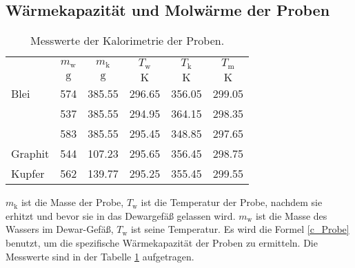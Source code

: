 \subsection{Wärmekapazität und Molwärme der Proben}
\begin{table}[htp]
	\centering
	\begin{tabular}{lccccc}
		\toprule
		& {$m_\text{w}$} & {$m_\text{k}$} & {$T_\text{w}$} & {$T_\text{k}$} & {$T_\text{m}$}\\
		&{$\si{\gram}$}& {$\si{\gram}$}  &{$\si{\kelvin}$}& {$\si{\kelvin}$}  &{$\si{\kelvin}$}\\
		\midrule
		Blei		&574&	385.55	& 296.65 &	356.05&	299.05\\
					&537&	385.55	& 294.95 &	364.15&	298.35\\
					&583&	385.55	& 295.45 &	348.85&	297.65\\	
		Graphit		&544&	107.23	& 295.65 &	356.45&	298.75\\
		Kupfer		&562& 	139.77	& 295.25 &	355.45&	299.55\\
		\bottomrule
	\end{tabular}
	\caption{Messwerte der Kalorimetrie der Proben.}
	\label{tab:messung2}
\end{table}
$m_\text{k}$ ist die Masse der Probe, $T_\text{w}$ ist die Temperatur der Probe, nachdem sie erhitzt und bevor sie in das Dewargefäß gelassen wird.
$m_\text{w}$ ist die Masse des Wassers im Dewar-Gefäß, $T_\text{w}$ ist seine Temperatur.
Es wird die Formel \eqref{c_Probe}
benutzt, um die spezifische Wärmekapazität der Proben zu ermitteln.
Die Messwerte sind in der Tabelle \ref{tab:messung2} aufgetragen.

